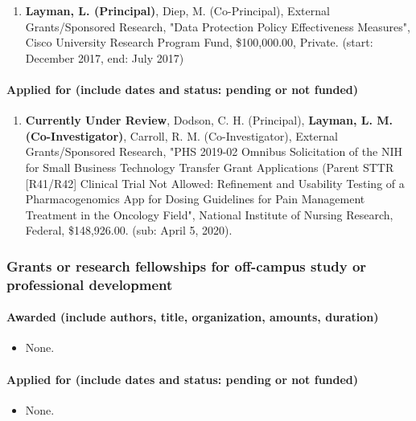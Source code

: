 \documentclass[10pt]{article}
\begin{document}
\priortouncw
\begin{enumerate}[resume]
	\item \textbf{Layman, L. (Principal)}, Diep, M. (Co-Principal), External Grants/Sponsored Research, "Data Protection Policy Effectiveness Measures", Cisco University Research Program Fund, \$100,000.00, Private. (start: December 2017, end: July 2017)

\end{enumerate}

\paragraph{Applied for (include dates and status: pending or not funded)}
\begin{enumerate}
    \item \textbf{Currently Under Review}, Dodson, C. H. (Principal),\textbf{ Layman, L. M. (Co-Investigator)}, Carroll, R. M. (Co-Investigator), External Grants/Sponsored Research, "PHS 2019-02 Omnibus Solicitation of the NIH for Small Business Technology Transfer Grant Applications (Parent STTR [R41/R42] Clinical Trial Not Allowed: Refinement and Usability Testing of a Pharmacogenomics App for Dosing Guidelines for Pain Management Treatment in the Oncology Field", National Institute of Nursing Research, Federal, \$148,926.00. (sub: April 5, 2020).
\end{enumerate}

\subsubsection{Grants or research fellowships for off-campus study or professional development}

\paragraph{Awarded (include authors, title, organization, amounts, duration)}
\begin{itemize}
    \item None.
\end{itemize}

\paragraph{Applied for (include dates and status: pending or not funded)}
\begin{itemize}
    \item None.
\end{itemize}
\end{document}
